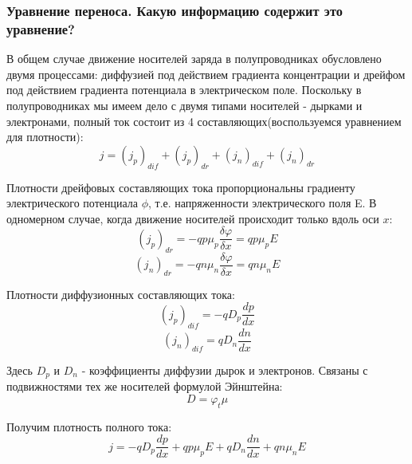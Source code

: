 \subsubsection{Уравнение переноса. Какую информацию содержит это уравнение?}

В общем случае движение носителей заряда в полупроводниках обусловлено двумя процессами: диффузией под действием градиента концентрации и дрейфом под действием градиента потенциала в электрическом поле. Поскольку в полупроводниках мы имеем дело с двумя типами носителей - дырками и электронами, полный ток состоит из 4 составляющих(воспользуемся уравнением для плотности):
$$
j = (j_p)_{dif} + (j_p)_{dr} + (j_n)_{dif} + (j_n)_{dr} 
$$

Плотности дрейфовых составляющих тока пропорциональны градиенту электрического потенциала $\phi$, т.е. напряженности электрического поля E. В одномерном случае, когда движение носителей происходит только вдоль оси $x$:
$$
(j_p)_{dr} = -qp\mu_p\frac{\delta \varphi}{\delta x} = qp\mu_pE
$$
$$
(j_n)_{dr} = -qn\mu_n\frac{\delta \varphi}{\delta x} = qn\mu_nE
$$

Плотности диффузионных составляющих тока:
$$
(j_p)_{dif} = -qD_p\frac{dp}{dx}
$$
$$
(j_n)_{dif} = qD_n\frac{dn}{dx}
$$

Здесь $D_p$ и $D_n$ - коэффициенты диффузии дырок и электронов. Связаны с подвижностями тех же носителей формулой Эйнштейна:
$$
D = \varphi_t\mu
$$

Получим плотность полного тока:
$$
j = -qD_p\frac{dp}{dx} + qp\mu_pE + qD_n\frac{dn}{dx} + qn\mu_nE
$$
